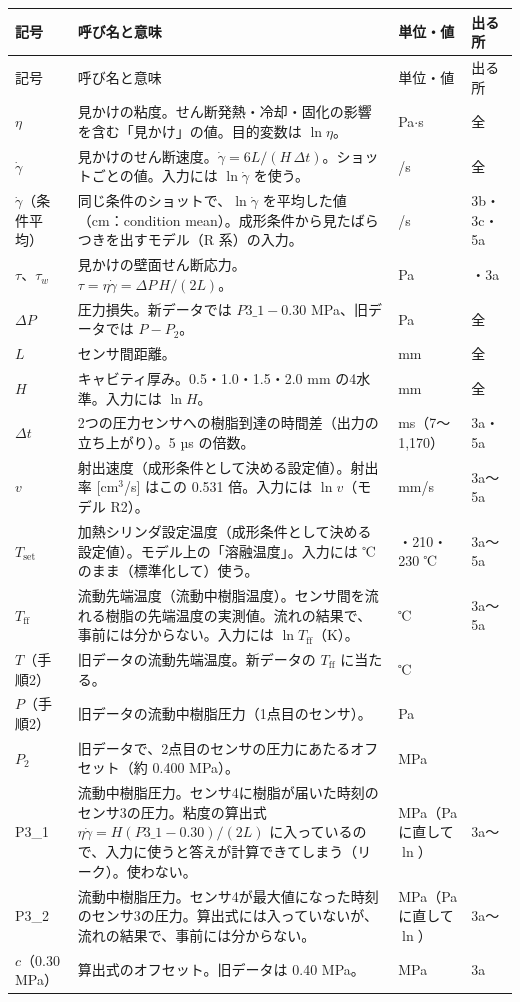 \documentclass[paper=a4paper,fontsize=10.5pt,line_length=44zw,number_of_lines=38]{jlreq}
\makeatletter
\newcommand{\gd}{\dot{\gamma}}
\newcommand{\Tff}{T_{\mathrm{ff}}}
\newcommand{\Tset}{T_{\mathrm{set}}}
\newcommand{\PI}{P3\_1}
\newcommand{\PII}{P3\_2}
\newenvironment{symtab}{%
  \begin{longtable}{@{}>{\raggedright\arraybackslash}p{6.5\zw}>{\raggedright\arraybackslash}p{22\zw}>{\raggedright\arraybackslash}p{6\zw}>{\raggedright\arraybackslash}p{4.5\zw}@{}}
  \toprule 記号 & 呼び名と意味 & 単位・値 & 出る所 \\ \midrule \endfirsthead
  \toprule 記号 & 呼び名と意味 & 単位・値 & 出る所 \\ \midrule \endhead
  \bottomrule \endlastfoot}{\end{longtable}}
\makeatother
\begin{document}
\begin{symtab}
$\eta$ & 見かけの粘度。せん断発熱・冷却・固化の影響を含む「見かけ」の値。目的変数は $\ln\eta$。 & Pa$\cdot$s & 全 \\
$\gd$ & 見かけのせん断速度。$\gd = 6L/(H\,\Delta t)$。ショットごとの値。入力には $\ln\gd$ を使う。 & 1/s & 全 \\
$\gd$（条件平均）& 同じ条件のショットで、$\ln\gd$ を平均した値（cm：condition mean）。成形条件から見たばらつきを出すモデル（R 系）の入力。 & 1/s & 3b・3c・5a \\
$\tau$、$\tau_w$ & 見かけの壁面せん断応力。$\tau = \eta\gd = \Delta P\,H/(2L)$。 & Pa & 2・3a \\
$\Delta P$ & 圧力損失。新データでは $\PI - 0.30$ MPa、旧データでは $P - P_2$。 & Pa & 全 \\
$L$ & センサ間距離。 & 17.5 mm & 全 \\
$H$ & キャビティ厚み。0.5・1.0・1.5・2.0 mm の4水準。入力には $\ln H$。 & mm & 全 \\
$\Delta t$ & 2つの圧力センサへの樹脂到達の時間差（出力の立ち上がり）。5 µs の倍数。 & ms（7〜1,170） & 3a・5a \\
$v$ & 射出速度（成形条件として決める設定値）。射出率 [cm$^3$/s] はこの 0.531 倍。入力には $\ln v$（モデル R2）。 & mm/s & 3a〜5a \\
$\Tset$ & 加熱シリンダ設定温度（成形条件として決める設定値）。モデル上の「溶融温度」。入力には ℃ のまま（標準化して）使う。 & 190・210・230 ℃ & 3a〜5a \\
$\Tff$ & 流動先端温度（流動中樹脂温度）。センサ間を流れる樹脂の先端温度の実測値。流れの結果で、事前には分からない。入力には $\ln\Tff$（K）。 & ℃ & 3a〜5a \\
$T$（手順2）& 旧データの流動先端温度。新データの $\Tff$ に当たる。 & ℃ & 2 \\
$P$（手順2）& 旧データの流動中樹脂圧力（1点目のセンサ）。 & Pa & 2 \\
$P_2$ & 旧データで、2点目のセンサの圧力にあたるオフセット（約 0.400 MPa）。 & MPa & 2 \\
\PI & 流動中樹脂圧力。センサ4に樹脂が届いた時刻のセンサ3の圧力。粘度の算出式 $\eta\gd = H(\PI - 0.30)/(2L)$ に入っているので、入力に使うと答えが計算できてしまう（リーク）。使わない。 & MPa（Pa に直して $\ln$） & 3a〜 \\
\PII & 流動中樹脂圧力。センサ4が最大値になった時刻のセンサ3の圧力。算出式には入っていないが、流れの結果で、事前には分からない。 & MPa（Pa に直して $\ln$） & 3a〜 \\
$c$（0.30 MPa）& 算出式のオフセット。旧データは 0.40 MPa。 & MPa & 3a \\

\end{symtab}
\end{document}
